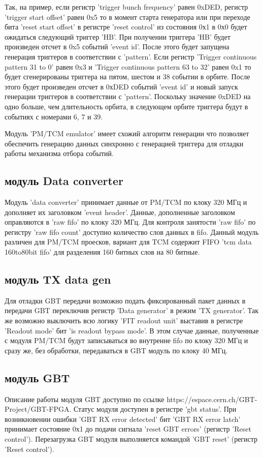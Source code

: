 \documentclass{article}
\begin{document}
Так, на пример, если регистр 'trigger bunch frequency' равен 0xDED, регистр 'trigger start offset' равен 0x5 то в момент старта генератора или при переходе бита 'reset start offset' в регистре 'reset control' из состояния 0х1 в 0х0 будет ожидаться следующий триггер 'HB'. При получении триггера 'HB' будет произведен отсчет в 0x5 событий 'event id'. После этого будет запущена генерация триггеров в соответствии с 'pattern'. Если регистр 'Trigger continuous pattern 31 to 0' равен 0x3 и 'Trigger continuous pattern 63 to 32' равен 0x1 то будет сгенерированы триггера на пятом, шестом и 38 событии в орбите. После этого будет произведен отсчет в 0хDED событий 'event id' и новый запуск генерации триггеров в соответствии с 'pattern'. Поскольку значение 0xDED на одно больше, чем длительность орбита, в следующем орбите триггера будут в событиях с номерами 6, 7 и 39.

Модуль 'PM/TCM emulator' имеет схожий алгоритм генерации что позволяет обеспечить генерацию данных синхронно с генерацией триггера для отладки работы механизма отбора событий.




\subsection{модуль Data converter}
Модуль 'data converter' принимает данные от PM/TCM по клоку 320 МГц и дополняет их заголовком 'event header'. Данные, дополненные заголовком оправляются в 'raw fifo' по клоку 320 МГц. Для контроля занятости 'raw fifo' по регистру 'raw fifo count' доступно количество слов данных в fifo.
Данный модуль различен для PM/TCM проесков, вариант для TCM содержит FIFO 'tcm data 160to80bit fifo' для разделения 160 битных слов на 80 битные.



\subsection{модуль TX data gen}
Для отладки GBT передачи возможно подать фиксированный пакет данных в передачи GBT переключив регистр 'Data generator' в режим 'TX generator'. Так же возможно выключить всю логику 'FIT readout unit' выставив в регистре 'Readout mode' бит 'is readout bypass mode'. В этом случае данные, полученные с модуля PM/TCM будут записываться во внутренне fifo по клоку 320 МГц и сразу же, без обработки, передаваться в GBT модуль по клоку 40 МГц.


\subsection{модуль GBT}
Описание работы модуля GBT доступно по ссылке https://espace.cern.ch/GBT-Project/GBT-FPGA. Статус модуля доступен в регистре 'gbt status'. При возникновении ошибки 'GBT RX error detected' бит 'GBT RX error latch' принимает состояние 0х1 до подачи сигнала 'reset GBT errors' (регистр 'Reset control'). Перезагрузка GBT модуля выполняется командой 'GBT reset' (регистр 'Reset control').
\end{document}
